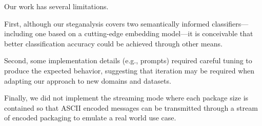 Our work has several limitations.

First, although our steganalysis covers two semantically informed classifiers---including one based on a cutting-edge embedding model---it is conceivable that better classification accuracy could be achieved through other means.

Second, some implementation details (e.g., prompts) required careful tuning to produce the expected behavior, suggesting that iteration may be required when adapting our approach to new domains and datasets.

Finally, we did not implement the streaming mode where each package size is contained so that ASCII encoded messages can be transmitted through a stream of encoded packaging to emulate a real world use case.



